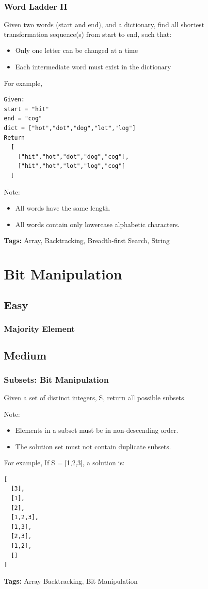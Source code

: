 \documentclass[11pt]{book}
\begin{document}
\subsection{Word Ladder II}
\label{sec-16-4-13}
Given two words (start and end), and a dictionary, find all shortest transformation sequence(s) from start to end, such that:
\begin{itemize}
\item Only one letter can be changed at a time
\item Each intermediate word must exist in the dictionary
\end{itemize}
For example,
\lstset{language=java,label= ,caption= ,numbers=none}
\begin{lstlisting}
Given:
start = "hit"
end = "cog"
dict = ["hot","dot","dog","lot","log"]
Return
  [
    ["hit","hot","dot","dog","cog"],
    ["hit","hot","lot","log","cog"]
  ]
\end{lstlisting}
Note:
\begin{itemize}
\item All words have the same length.
\item All words contain only lowercase alphabetic characters.
\end{itemize}
\textbf{Tags:} Array, Backtracking, Breadth-first Search, String

\chapter{Bit Manipulation}
\label{sec-17}
\section{Easy}
\label{sec-17-1}
\subsection{Majority Element}
\label{sec-17-1-1}
\section{Medium}
\label{sec-17-2}
\subsection{Subsets: Bit Manipulation}
\label{sec-17-2-1}
Given a set of distinct integers, S, return all possible subsets.

Note:
\begin{itemize}
\item Elements in a subset must be in non-descending order.
\item The solution set must not contain duplicate subsets.
\end{itemize}
For example,
If S = [1,2,3], a solution is:
\lstset{language=java,label= ,caption= ,numbers=none}
\begin{lstlisting}
[
  [3],
  [1],
  [2],
  [1,2,3],
  [1,3],
  [2,3],
  [1,2],
  []
]
\end{lstlisting}
\textbf{Tags:} Array Backtracking, Bit Manipulation
\end{document}
